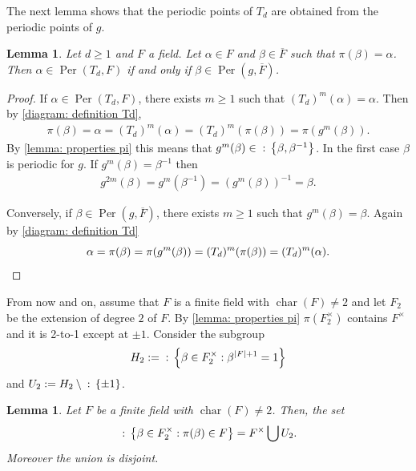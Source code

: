\documentclass{amsart}
\def\set#1{{\def\st{\;:\;}\left\{#1\right\}}}
\def\abs#1{\left\vert{#1}\right\vert}
\DeclareMathOperator{\Per}{Per}
\DeclareMathOperator{\car}{char}
\DeclareMathOperator{\st}{st}
\newtheorem{lemma}[proposition]{Lemma}
\theoremstyle{definition}
\begin{document}
The next lemma shows that the periodic points of $T_d$ are obtained from the periodic points of $g$. 

\begin{lemma}
Let $d \geq 1$ and $F$ a field. Let $\alpha \in F$ and $\beta \in \overline{F}$ such that $\pi(\beta) = \alpha$. Then $\alpha \in \Per(T_d, F)$ if and only if $\beta \in \Per(g, \overline{F})$.
\label{lemma: Per Td bijection Per g}
\end{lemma}

\begin{proof}
If $\alpha \in \Per(T_d, F)$, there exists $m \geq 1$ such that $(T_d)^m(\alpha) = \alpha$. Then by \cref{diagram: definition Td}, 
\begin{align*}
\pi(\beta) = \alpha = (T_d)^m(\alpha) = (T_d)^m(\pi(\beta)) = \pi(g^m(\beta)).
\end{align*}
By \cref{lemma: properties pi} this means that $g^m(\beta) \in \set{\beta, \beta^{-1}}$. In the first case $\beta$ is periodic for $g$. If $g^m(\beta) = \beta^{-1}$ then 
\begin{align*}
g^{2m}(\beta) = g^m(\beta^{-1}) = (g^m(\beta))^{-1} = \beta.
\end{align*}

Conversely, if $\beta \in \Per(g,\overline{F})$, there exists $m \geq 1$ such that $g^m(\beta) = \beta$. Again by \cref{diagram: definition Td}
\begin{equation*}
\alpha = \pi(\beta) = \pi(g^m(\beta)) = (T_d)^m(\pi(\beta)) = (T_d)^m(\alpha).  \qedhere
\end{equation*}
\end{proof}

From now and on, assume that $F$ is a finite field with $\car(F) \neq 2$ and let $F_2$ be the extension of degree $2$ of $F$. By \cref{lemma: properties pi} $\pi(F_2^\times)$ contains $F^\times$ and it is 2-to-1 except at $\pm 1$. Consider the subgroup 
\begin{align*}
H_2 := \set{\beta \in F_2^\times: \beta^{\abs{F}+1 } = 1}
\end{align*}
and $U_2 := H_2 \setminus \set{\pm 1}$. 



\begin{lemma}
Let $F$ be a finite field with $\car(F) \neq 2$. Then, the set $$\set{\beta \in F_2^\times: \pi(\beta) \in F} = F^\times \bigcup U_2.$$ Moreover the union is disjoint.
\label{lemma: Fp and U2}
\end{lemma}
\end{document}
